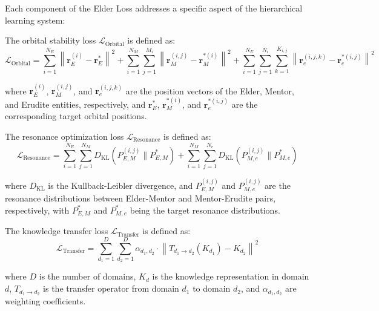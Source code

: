 Each component of the Elder Loss addresses a specific aspect of the hierarchical learning system:

\begin{definition}
The orbital stability loss $\mathcal{L}_{\text{Orbital}}$ is defined as:
\begin{equation}
\mathcal{L}_{\text{Orbital}} = \sum_{i=1}^{N_E} \left\|\mathbf{r}_E^{(i)} - \mathbf{r}_E^{*}\right\|^2 + \sum_{i=1}^{N_M} \sum_{j=1}^{M_i} \left\|\mathbf{r}_M^{(i,j)} - \mathbf{r}_M^{*(i)}\right\|^2 + \sum_{i=1}^{N_E} \sum_{j=1}^{N_i} \sum_{k=1}^{K_{i,j}} \left\|\mathbf{r}_e^{(i,j,k)} - \mathbf{r}_e^{*(i,j)}\right\|^2
\end{equation}

where $\mathbf{r}_E^{(i)}$, $\mathbf{r}_M^{(i,j)}$, and $\mathbf{r}_e^{(i,j,k)}$ are the position vectors of the Elder, Mentor, and Erudite entities, respectively, and $\mathbf{r}_E^{*}$, $\mathbf{r}_M^{*(i)}$, and $\mathbf{r}_e^{*(i,j)}$ are the corresponding target orbital positions.
\end{definition}

\begin{definition}
The resonance optimization loss $\mathcal{L}_{\text{Resonance}}$ is defined as:
\begin{equation}
\mathcal{L}_{\text{Resonance}} = \sum_{i=1}^{N_E} \sum_{j=1}^{N_M} D_{\text{KL}}(P_{E,M}^{(i,j)} \| P_{E,M}^{*}) + \sum_{i=1}^{N_M} \sum_{j=1}^{N_e} D_{\text{KL}}(P_{M,e}^{(i,j)} \| P_{M,e}^{*})
\end{equation}

where $D_{\text{KL}}$ is the Kullback-Leibler divergence, and $P_{E,M}^{(i,j)}$ and $P_{M,e}^{(i,j)}$ are the resonance distributions between Elder-Mentor and Mentor-Erudite pairs, respectively, with $P_{E,M}^{*}$ and $P_{M,e}^{*}$ being the target resonance distributions.
\end{definition}

\begin{definition}
The knowledge transfer loss $\mathcal{L}_{\text{Transfer}}$ is defined as:
\begin{equation}
\mathcal{L}_{\text{Transfer}} = \sum_{d_1=1}^{D} \sum_{d_2=1}^{D} \alpha_{d_1,d_2} \cdot \left\|T_{d_1 \rightarrow d_2}(K_{d_1}) - K_{d_2}\right\|^2
\end{equation}

where $D$ is the number of domains, $K_{d}$ is the knowledge representation in domain $d$, $T_{d_1 \rightarrow d_2}$ is the transfer operator from domain $d_1$ to domain $d_2$, and $\alpha_{d_1,d_2}$ are weighting coefficients.
\end{definition}


